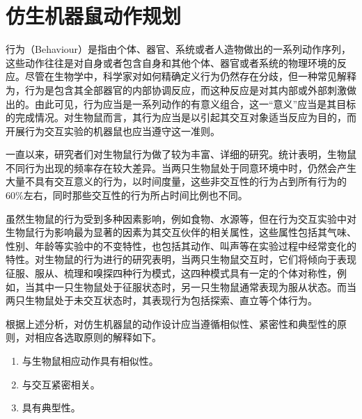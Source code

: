 \section{仿生机器鼠动作规划}
行为（Behaviour）是指由个体、器官、系统或者人造物做出的一系列动作序列，这些动作往往是对自身或者包含自身和其他个体、器官或者系统的物理环境的反应\cite{mintonBeliefSystemsReligion2013}。尽管在生物学中，科学家对如何精确定义行为仍然存在分歧，但一种常见解释为，行为是包含其全部器官的内部协调反应，而这种反应是对其内部或外部刺激做出的\cite{levitisBehaviouralBiologistsNot2009}。由此可见，行为应当是一系列动作的有意义组合，这一“意义”应当是其目标的完成情况。对生物鼠而言，其行为应当是以引起其交互对象适当反应为目的，而开展行为交互实验的机器鼠也应当遵守这一准则。

一直以来，研究者们对生物鼠行为做了较为丰富、详细的研究。统计表明，生物鼠不同行为出现的频率存在较大差异。当两只生物鼠处于同意环境中时，仍然会产生大量不具有交互意义的行为，以时间度量，这些非交互性的行为占到所有行为的$60\%$左右\cite{ISI:000436213800018}，同时那些交互性的行为所占时间比例也不同。

虽然生物鼠的行为受到多种因素影响，例如食物、水源等，但在行为交互实验中对生物鼠行为影响最为显著的因素为其交互伙伴的相关属性，这些属性包括其气味、性别、年龄等实验中的不变特性，也包括其动作、叫声等在实验过程中经常变化的特性\cite{whishawBehaviorLaboratoryRat2005}。\citeauthor{BarnettSTheRat}对生物鼠的行为进行的研究表明，当两只生物鼠交互时，它们将倾向于表现征服、服从、梳理和嗅探四种行为模式，这四种模式具有一定的个体对称性，例如，当其中一只生物鼠处于征服状态时，另一只生物鼠通常表现为服从状态\cite{BarnettSTheRat}。而当两只生物鼠处于未交互状态时，其表现行为包括探索、直立等个体行为。

根据上述分析，对仿生机器鼠的动作设计应当遵循相似性、紧密性和典型性的原则，对相应各选取原则的解释如下。
\begin{enumerate}[leftmargin=0em, listparindent=2em, parsep=0em, topsep=0em, label=（\theenumi）]
\setlength{\itemindent}{4em}
\setlength{\labelsep}{0em}
\setlength{\labelwidth}{2em}
\setlength{\parsep}{0em}
\setlength{\itemsep}{0em}
\setlength{\topsep}{0em}
  \item 与生物鼠相应动作具有相似性。
  \item 与交互紧密相关。
  \item 具有典型性。
\end{enumerate}

